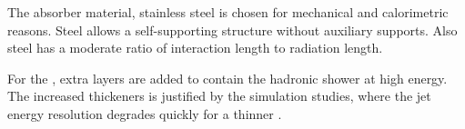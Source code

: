 The absorber material, stainless steel is chosen for mechanical and calorimetric reasons. Steel allows a self-supporting structure without auxiliary supports. Also steel has a moderate ratio of interaction length to radiation length.

For the \CLICILD, extra layers are added to contain the hadronic shower at high energy. The increased thickeners is justified by the simulation studies, where the jet energy resolution degrades quickly for a thinner \HCAL.

